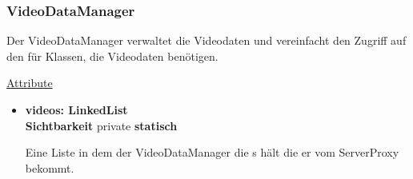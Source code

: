 \newpage
\subsubsection{VideoDataManager}\label{VideoDataManager}
Der VideoDataManager verwaltet die Videodaten und vereinfacht den Zugriff auf den  für Klassen, die Videodaten benötigen. \newline

\underline{Attribute}
\begin{itemize}
\itemsep0pt

\item \textbf{videos: LinkedList}\hfill\\
\textbf{Sichtbarkeit} private \newline
\textbf{statisch}

Eine Liste in dem der VideoDataManager die s hält die er vom ServerProxy bekommt.
\end{itemize}

